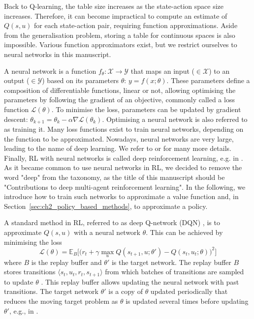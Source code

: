 Back to Q-learning, the table size increases as the state-action space size increases.
Therefore, it can become impractical to compute an estimate of $Q(s, u)$ for each state-action pair, requiring function approximations.
Aside from the generalisation problem, storing a table for continuous spaces is also impossible.
Various function approximators exist, but we restrict ourselves to neural networks in this manuscript.

A neural network is a function $f_\theta: \mathcal{X} \rightarrow \mathcal{Y}$ that maps an input ($\in\mathcal{X}$) to an output ($\in\mathcal{Y}$) based on its parameters $\theta$: $y = f(x;\theta)$.
These parameters define a composition of differentiable functions, linear or not, allowing optimising the parameters by following the gradient of an objective, commonly called a loss function $\mathcal{L}(\theta)$.
To minimise the loss, parameters can be updated by gradient descent: $\theta_{k+1} = \theta_k - \alpha \nabla \mathcal{L}(\theta_k)$.
Optimising a neural network is also referred to as training it.
Many loss functions exist to train neural networks, depending on the function to be approximated.
Nowadays, neural networks are very large, leading to the name of deep learning.
We refer to \citep{zhang2023dive} or \citep{prince2023understanding} for many more details.
Finally, RL with neural networks is called deep reinforcement learning, e.g. in \citep{introDeepRL}.
As it became common to use neural networks in RL, we decided to remove the word "deep" from the taxonomy, as the title of this manuscript should be "Contributions to deep multi-agent reinforcement learning".
In the following, we introduce how to train such networks to approximate a value function and, in Section~\ref{sec:ch2_policy_based_methods}, to approximate a policy.

A standard method in RL, referred to as deep Q-network (DQN) \citep{Mnih2015}, is to approximate $Q(s, u)$ with a neural network $\theta$.
This can be achieved by minimising the loss 
\begin{equation}
\label{eq:ch2_dqnloss}
    \mathcal{L}(\theta) = \mathbb{E}_B \big[\big(r_{t} + \gamma \max_u Q(s_{t+1}, u; \theta')- Q(s_{t}, u_{t}; \theta)\big)^{2}\big]
\end{equation}
where $B$ is the replay buffer and $\theta'$ is the target network.
The replay buffer $B$ stores transitions $\langle s_{t},u_{t},r_{t},s_{t+1}\rangle$ from which batches of transitions are sampled to update $\theta$ \citep{lin1992self}.
This replay buffer allows updating the neural network with past transitions.
The target network $\theta'$ is a copy of $\theta$ updated periodically that reduces the moving target problem as $\theta$ is updated several times before updating $\theta'$, e.g., in \citep{Mnih2015}.

